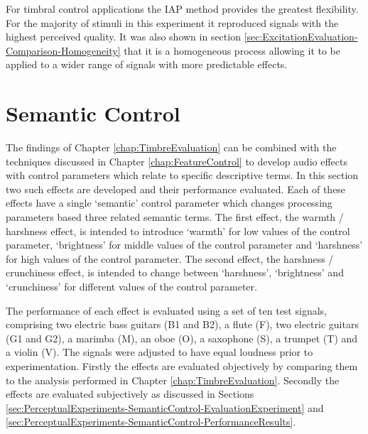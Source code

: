 	For timbral control applications the IAP method provides the greatest flexibility. For the majority of stimuli in
	this experiment it reproduced signals with the highest perceived quality. It was also shown in section
	\ref{sec:ExcitationEvaluation-Comparison-Homogeneity} that it is a homogeneous process allowing it to be applied to
	a wider range of signals with more predictable effects.

\section{Semantic Control}
\label{sec:PerceptualExperiments-SemanticControl}
	The findings of Chapter \ref{chap:TimbreEvaluation} can be combined with the techniques discussed in Chapter
	\ref{chap:FeatureControl} to develop audio effects with control parameters which relate to specific descriptive
	terms. In this section two such effects are developed and their performance evaluated. Each of these effects have a
	single `semantic' control parameter which changes processing parameters based three related semantic terms. The
	first effect, the warmth / harshness effect, is intended to introduce `warmth' for low values of the
	control parameter, `brightness' for middle values of the control parameter and `harshness' for high values of the
	control parameter. The second effect, the harshness / crunchiness effect, is intended to change between
	`harshness', `brightness' and `crunchiness' for different values of the control parameter.

	The performance of each effect is evaluated using a set of ten test signals, comprising two electric bass guitars
	(B1 and B2), a flute (F), two electric guitars (G1 and G2), a marimba (M), an oboe (O), a saxophone (S), a trumpet
	(T) and a violin (V). The signals were adjusted to have equal loudness prior to experimentation.  Firstly the
	effects are evaluated objectively by comparing them to the analysis performed in Chapter
	\ref{chap:TimbreEvaluation}. Secondly the effects are evaluated subjectively as discussed in Sections
	\ref{sec:PerceptualExperiments-SemanticControl-EvaluationExperiment} and
	\ref{sec:PerceptualExperiments-SemanticControl-PerformanceResults}.

